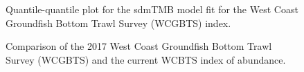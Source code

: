 \documentclass[
]{scrartcl}
\begin{document}
\begin{figure}


\caption{\label{fig-wcgbts_qq}Quantile-quantile plot for the sdmTMB
model fit for the West Coast Groundfish Bottom Trawl Survey (WCGBTS)
index.}

\end{figure}%

\begin{figure}


\caption{\label{fig-wcgbtsindexcomparison}Comparison of the 2017 West
Coast Groundfish Bottom Trawl Survey (WCGBTS) and the current WCBTS
index of abundance.}

\end{figure}%
\end{document}
